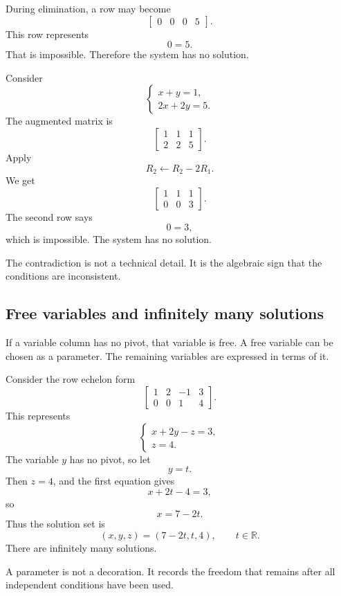 During elimination, a row may become
\[
\left[
\begin{array}{ccc|c}
0&0&0&5
\end{array}
\right].
\]
This row represents
\[
0=5.
\]
That is impossible. Therefore the system has no solution.

\begin{examplebox}
Consider
\[
\begin{cases}
x+y=1,\\
2x+2y=5.
\end{cases}
\]
The augmented matrix is
\[
\left[
\begin{array}{cc|c}
1&1&1\\
2&2&5
\end{array}
\right].
\]
Apply
\[
R_2\leftarrow R_2-2R_1.
\]
We get
\[
\left[
\begin{array}{cc|c}
1&1&1\\
0&0&3
\end{array}
\right].
\]
The second row says
\[
0=3,
\]
which is impossible. The system has no solution.
\end{examplebox}

The contradiction is not a technical detail. It is the algebraic sign that the conditions are inconsistent.

\subsection*{Free variables and infinitely many solutions}

If a variable column has no pivot, that variable is free. A free variable can be chosen as a parameter. The remaining variables are expressed in terms of it.

\begin{examplebox}
Consider the row echelon form
\[
\left[
\begin{array}{ccc|c}
1&2&-1&3\\
0&0&1&4
\end{array}
\right].
\]
This represents
\[
\begin{cases}
x+2y-z=3,\\
z=4.
\end{cases}
\]
The variable \(y\) has no pivot, so let
\[
y=t.
\]
Then \(z=4\), and the first equation gives
\[
x+2t-4=3,
\]
so
\[
x=7-2t.
\]
Thus the solution set is
\[
(x,y,z)=(7-2t,t,4),
\qquad t\in\mathbb{R}.
\]
There are infinitely many solutions.
\end{examplebox}

A parameter is not a decoration. It records the freedom that remains after all independent conditions have been used.

